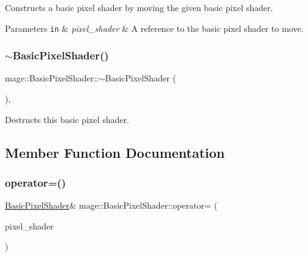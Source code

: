 Constructs a basic pixel shader by moving the given basic pixel shader.


\begin{DoxyParams}[1]{Parameters}
\mbox{\tt in}  & {\em pixel\+\_\+shader} & A reference to the basic pixel shader to move. \\
\hline
\end{DoxyParams}
\hypertarget{classmage_1_1_basic_pixel_shader_a7b4ac308850eb9ad55cbbd1e6389271b}{}\label{classmage_1_1_basic_pixel_shader_a7b4ac308850eb9ad55cbbd1e6389271b} 
\subsubsection{\texorpdfstring{$\sim$\+Basic\+Pixel\+Shader()}{~BasicPixelShader()}}
{\footnotesize\ttfamily mage\+::\+Basic\+Pixel\+Shader\+::$\sim$\+Basic\+Pixel\+Shader (\begin{DoxyParamCaption}{ }\end{DoxyParamCaption})\hspace{0.3cm}{\ttfamily [virtual]}, {\ttfamily [default]}}

Destructs this basic pixel shader. 

\subsection{Member Function Documentation}
\hypertarget{classmage_1_1_basic_pixel_shader_a9656fdae2d17691d3e7dd850e7844efb}{}\label{classmage_1_1_basic_pixel_shader_a9656fdae2d17691d3e7dd850e7844efb} 
\subsubsection{\texorpdfstring{operator=()}{operator=()}\hspace{0.1cm}{\footnotesize\ttfamily [1/2]}}
{\footnotesize\ttfamily \hyperlink{classmage_1_1_basic_pixel_shader}{Basic\+Pixel\+Shader}\& mage\+::\+Basic\+Pixel\+Shader\+::operator= (\begin{DoxyParamCaption}\item[{const \hyperlink{classmage_1_1_basic_pixel_shader}{Basic\+Pixel\+Shader} \&}]{pixel\+\_\+shader }\end{DoxyParamCaption})\hspace{0.3cm}{\ttfamily [delete]}}

